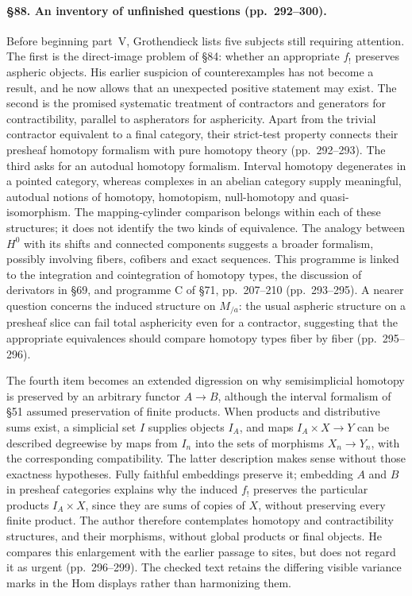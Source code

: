 \paragraph{\S88. An inventory of unfinished questions (pp.\ 292--300).}
Before beginning part~V, Grothendieck lists five subjects still requiring attention. The first is the direct-image problem of \S84: whether an appropriate $f_!$ preserves aspheric objects. His earlier suspicion of counterexamples has not become a result, and he now allows that an unexpected positive statement may exist. The second is the promised systematic treatment of contractors and generators for contractibility, parallel to aspherators for asphericity. Apart from the trivial contractor equivalent to a final category, their strict-test property connects their presheaf homotopy formalism with pure homotopy theory (pp.\ 292--293). The third asks for an autodual homotopy formalism. Interval homotopy degenerates in a pointed category, whereas complexes in an abelian category supply meaningful, autodual notions of homotopy, homotopism, null-homotopy and quasi-isomorphism. The mapping-cylinder comparison belongs within each of these structures; it does not identify the two kinds of equivalence. The analogy between $H^0$ with its shifts and connected components suggests a broader formalism, possibly involving fibers, cofibers and exact sequences. This programme is linked to the integration and cointegration of homotopy types, the discussion of derivators in \S69, and programme C of \S71, pp.\ 207--210 (pp.\ 293--295). A nearer question concerns the induced structure on $M_{/a}$: the usual aspheric structure on a presheaf slice can fail total asphericity even for a contractor, suggesting that the appropriate equivalences should compare homotopy types fiber by fiber (pp.\ 295--296).

The fourth item becomes an extended digression on why semisimplicial homotopy is preserved by an arbitrary functor $A\to B$, although the interval formalism of \S51 assumed preservation of finite products. When products and distributive sums exist, a simplicial set $I$ supplies objects $I_A$, and maps $I_A\times X\to Y$ can be described degreewise by maps from $I_n$ into the sets of morphisms $X_n\to Y_n$, with the corresponding compatibility. The latter description makes sense without those exactness hypotheses. Fully faithful embeddings preserve it; embedding $A$ and $B$ in presheaf categories explains why the induced $f_!$ preserves the particular products $I_A\times X$, since they are sums of copies of $X$, without preserving every finite product. The author therefore contemplates homotopy and contractibility structures, and their morphisms, without global products or final objects. He compares this enlargement with the earlier passage to sites, but does not regard it as urgent (pp.\ 296--299). The checked text retains the differing visible variance marks in the Hom displays rather than harmonizing them.

